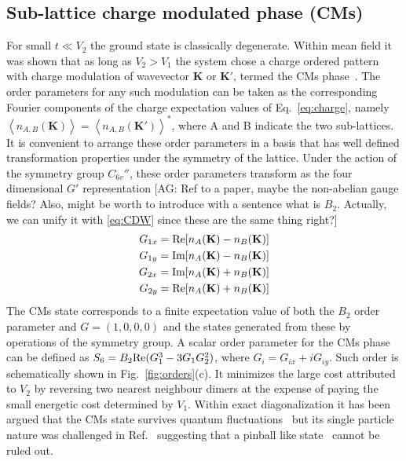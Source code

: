 \documentclass[aps,prx,10pt,twocolumn,floatfix,superscriptaddress,showpacs,numerical,footinbib]{revtex4-1}
\newcommand{\noteAG}[1]{{\color{blue} [AG: #1]}}
\begin{document}
\subsection{Sub-lattice charge modulated phase (CMs)}
%
For small $t \ll V_{2}$ the ground state is classically degenerate. 
%
Within mean field it was shown that as long as $V_{2}>V_{1}$ the system chose a charge ordered pattern with charge modulation 
of wavevector $\mathbf{K}$ or $\mathbf{K}'$, termed the CMs phase~\cite{GCC13}. 
%
The order parameters for any such modulation can be taken as the corresponding Fourier components of the charge expectation values of Eq.~\eqref{eq:charge},
namely $\left\langle n_{A,B}(\mathbf{K}) \right\rangle = \left\langle n_{A,B}(\mathbf{K}') \right\rangle^*$, where A and B indicate the two sub-lattices.
%
It is convenient to arrange these order parameters in a basis that has well defined transformation properties under the symmetry of the lattice.
%
Under the action of the symmetry group $C_{6v}''$, these order parameters transform as the four dimensional $G'$ representation 
\noteAG{Ref to a paper, maybe the non-abelian gauge fields? Also, might be worth to introduce with a sentence what is $B_2$.
Actually, we can unify it with \eqref{eq:CDW} since these are the same thing right?}
%
\begin{align}
G_{1x} = {\rm Re}[n_{A}(\mathbf{K}) -n_{B}(\mathbf{K})] \\
G_{1y} =  {\rm Im}[n_{A}(\mathbf{K}) -n_{B}(\mathbf{K})] \\
G_{2x} =  {\rm Im}[n_{A}(\mathbf{K}) +n_{B}(\mathbf{K})] \\
G_{2y} =  {\rm Re}[n_{A}(\mathbf{K}) +n_{B}(\mathbf{K})]
\end{align}
%
The CMs state corresponds to a finite expectation value of both the $B_2$ order parameter and $G = (1,0,0,0)$ and the states generated from these by operations of the symmetry group. A scalar order parameter for the CMs phase can be defined as $S_6 = B_2 {\rm Re}(G_1^3-3G_1G_2^2)$, where $G_i = G_{ix}+iG_{iy}$. 
%
Such order is schematically shown in Fig.~\ref{fig:orders}(c). It minimizes the large cost
attributed to $V_{2}$ by reversing two nearest neighbour dimers at the expense of paying the small energetic cost determined by $V_{1}$.
%
Within exact diagonalization it has been argued that the CMs state survives quantum fluctuations~\cite{GGNVC13,DH14,DCH14} 
but its single particle nature was challenged in Ref.~ suggesting that a pinball like state~\cite{HF06,MRF13} cannot be ruled out.\\
\end{document}
